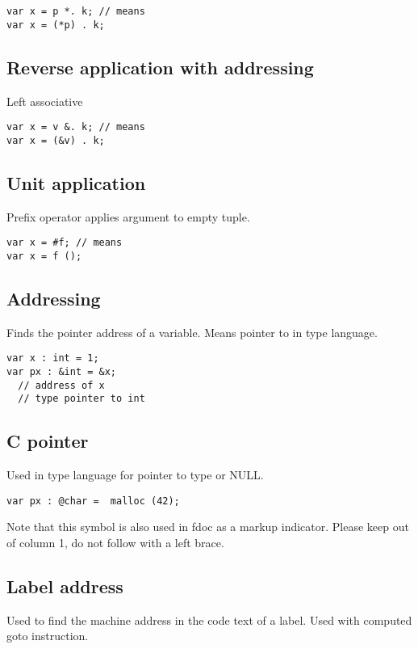 \documentclass[oneside]{book}
\begin{document}
{\begin{verbatim}
var x = p *. k; // means
var x = (*p) . k;
\end{verbatim}


\subsection{Reverse application with addressing}
Left associative

\begin{verbatim}
var x = v &. k; // means
var x = (&v) . k;
\end{verbatim}


\subsection{Unit application}
Prefix operator applies argument to empty tuple.

\begin{verbatim}
var x = #f; // means
var x = f ();
\end{verbatim}


\subsection{Addressing}
Finds the pointer address of a variable.
Means pointer to in type language.

\begin{verbatim}
var x : int = 1;
var px : &int = &x; 
  // address of x
  // type pointer to int
\end{verbatim}


\subsection{C pointer}
Used in type language for pointer to type or NULL.

\begin{verbatim}
var px : @char =  malloc (42);
\end{verbatim}


Note that this symbol is also used in fdoc as a markup
indicator. Please keep out of column 1, do not follow
with a left brace.

\subsection{Label address}
Used to find the machine address in the code text of
a label. Used with computed goto instruction.

}
\end{document}
